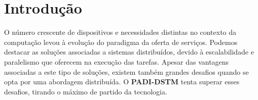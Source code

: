 \section{Introdução}

O número crescente de dispositivos e necessidades distintas no contexto da computação levou à evolução do paradigma da oferta de serviços. Podemos destacar as soluções associadas a sistemas distribuídos, devido à escalabilidade e paralelismo que oferecem na execução das tarefas. Apesar das vantagens associadas a este tipo de soluções, existem também grandes desafios quando se opta por uma abordagem distribuída. O \textbf{PADI-DSTM} tenta superar esses desafios, tirando o máximo de partido da tecnologia.

